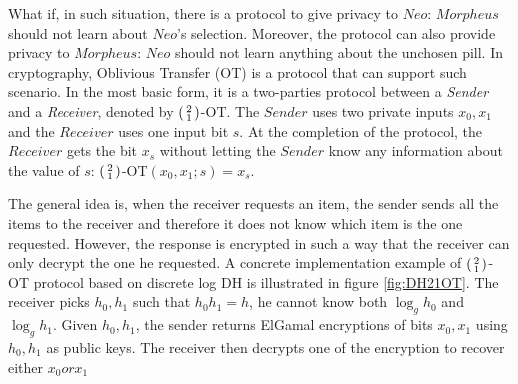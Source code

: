 What if, in such situation, there is a protocol to give privacy to
\(Neo\): \(Morpheus\) should not learn about \(Neo\)'s selection. Moreover, the
protocol can also provide privacy to \(Morpheus\): \(Neo\) should not learn
anything about the unchosen pill. In cryptography, Oblivious Transfer (OT) is a
protocol that can support such scenario. 
In the most basic form, it is a
two-parties protocol between a \textit{Sender} and a \textit{Receiver}, denoted
by \(\begin{psmallmatrix} 2 \\ 1 \end{psmallmatrix} \)-OT. The \(Sender\) uses
two private inputs \(x_{0}, x_{1}\) and the \(Receiver\) uses one input bit
\(s\). At the completion of the protocol, the \(Receiver\) gets the bit
\(x_{s}\) without letting the \(Sender\) know any information about the value of
\(s\): \(\begin{psmallmatrix} 2 \\ 1 \end{psmallmatrix}
\)-OT\((x_{0},x_{1};s) = x_{s}\).

The general idea is, when the receiver requests an item, the sender sends all the
items to the receiver and therefore it does not know which item is the one
requested. However, the response is encrypted in such a way that the receiver
can only decrypt the one he requested. A concrete implementation example of
\(\begin{psmallmatrix} 2 \\ 1 \end{psmallmatrix} \)-OT protocol based on
discrete log DH is illustrated in figure \ref{fig:DH21OT}. The receiver picks \(h_{0},h_{1}\) such that \(h_{0}h_{1} = h\), he cannot know both \(\log_{g}h_{0}\) and \(\log_{g}h_{1}\). Given \(h_{0}, h_{1}\), the sender returns ElGamal encryptions of bits \(x_{0}, x_{1}\) using \(h_{0},h_{1}\) as public keys. The receiver then decrypts one of the encryption to recover either \(x_{0} or x_{1}\)

